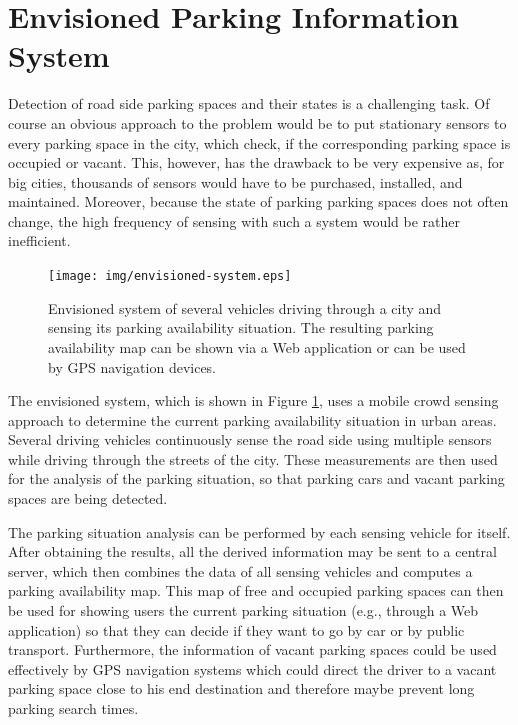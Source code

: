 \section{Envisioned Parking Information System}

Detection of road side parking spaces and their states is a challenging task. Of course an obvious approach to the problem would be to put stationary sensors to every parking space in the city, which check, if the corresponding parking space is occupied or vacant. This, however, has the drawback to be very expensive as, for big cities, thousands of sensors would have to be purchased, installed, and maintained. Moreover, because the state of parking parking spaces does not often change, the high frequency of sensing with such a system would be rather inefficient.

\begin{figure}
	\centering
	\texttt{[image: img/envisioned-system.eps]}
	\caption{Envisioned system of several vehicles driving through a city and sensing its parking availability situation. The resulting parking availability map can be shown via a Web application or can be used by GPS navigation devices.}
	\label{fig:envisioned_system}
\end{figure}

The envisioned system, which is shown in Figure \ref{fig:envisioned_system}, uses a mobile crowd sensing approach to determine the current parking availability situation in urban areas. Several driving vehicles continuously sense the road side using multiple sensors while driving through the streets of the city. These measurements are then used for the analysis of the parking situation, so that parking cars and vacant parking spaces are being detected. 

The parking situation analysis can be performed by each sensing vehicle for itself. After obtaining the results, all the derived information may be sent to a central server, which then combines the data of all sensing vehicles and computes a parking availability map. This map of free and occupied parking spaces can then be used for showing users the current parking situation (e.g., through a Web application) so that they can decide if they want to go by car or by public transport. Furthermore, the information of vacant parking spaces could be used effectively by GPS navigation systems which could direct the driver to a vacant parking space close to his end destination and therefore maybe prevent long parking search times.







